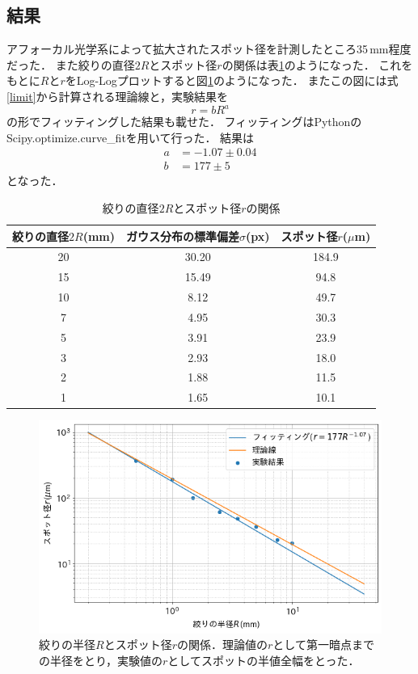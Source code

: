 \documentclass[titlepage]{jsarticle}
\begin{document}
\subsection{結果}
アフォーカル光学系によって拡大されたスポット径を計測したところ35\,mm程度だった．
また絞りの直径$2R$とスポット径$r$の関係は表\ref{tab:R-r}のようになった．
これをもとに$R$と$r$をLog-Logプロットすると図\ref{fig:exp2}のようになった．
またこの図には式\eqref{limit}から計算される理論線と，実験結果を
\begin{equation}
    r = bR^a
\end{equation}
の形でフィッティングした結果も載せた．
フィッティングはPythonのScipy.optimize.curve\_fitを用いて行った．
結果は
\begin{align*}
    a &= -1.07 \pm 0.04 \\
    b &= 177 \pm 5
\end{align*}
となった．

\begin{table}[htbp]
    \centering
    \caption{絞りの直径$2R$とスポット径$r$の関係}
    \label{tab:R-r}    
    \begin{tabular}{ccc}
        絞りの直径$2R$(mm) & ガウス分布の標準偏差$\sigma$(px) & スポット径$r$($\mu$m) \\
        \hline\hline
        20 & 30.20 & 184.9 \\
        15 & 15.49 & 94.8 \\
        10 & 8.12 & 49.7 \\
        7 & 4.95 & 30.3 \\
        5 & 3.91 & 23.9 \\
        3 & 2.93 & 18.0 \\
        2 & 1.88 & 11.5 \\
        1 & 1.65 & 10.1 \\
        \hline
    \end{tabular}
\end{table}

\begin{figure}[htbp]
    \centering
    \includegraphics[width=13cm]{exp2_2.png}
    \caption{絞りの半径$R$とスポット径$r$の関係．理論値の$r$として第一暗点までの半径をとり，実験値の$r$としてスポットの半値全幅をとった．}
    \label{fig:exp2}
\end{figure}
\end{document}
